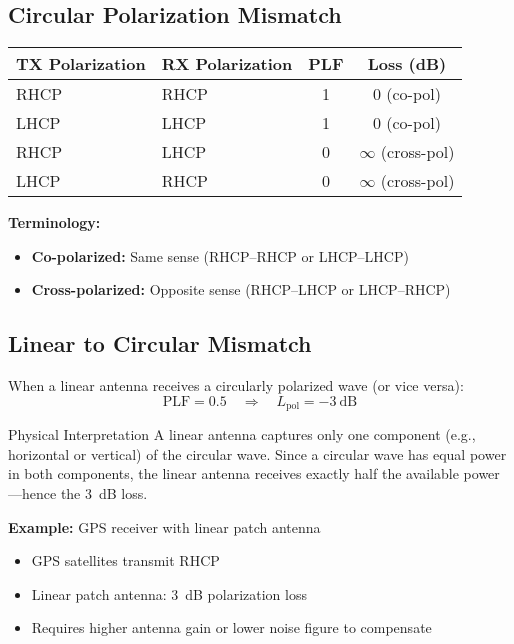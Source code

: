 \subsection{Circular Polarization Mismatch}

\begin{center}
\begin{tabular}{@{}llcc@{}}
\toprule
\textbf{TX Polarization} & \textbf{RX Polarization} & \textbf{PLF} & \textbf{Loss (dB)} \\
\midrule
RHCP & RHCP & 1 & 0 (co-pol) \\
LHCP & LHCP & 1 & 0 (co-pol) \\
RHCP & LHCP & 0 & $\infty$ (cross-pol) \\
LHCP & RHCP & 0 & $\infty$ (cross-pol) \\
\bottomrule
\end{tabular}
\end{center}

\textbf{Terminology:}
\begin{itemize}
\item \textbf{Co-polarized:} Same sense (RHCP--RHCP or LHCP--LHCP)
\item \textbf{Cross-polarized:} Opposite sense (RHCP--LHCP or LHCP--RHCP)
\end{itemize}

\subsection{Linear to Circular Mismatch}

When a linear antenna receives a circularly polarized wave (or vice versa):
\begin{equation}
\mathrm{PLF} = 0.5 \quad \Rightarrow \quad L_{\text{pol}} = -3\ \text{dB}
\label{eq:lin-circ-loss}
\end{equation}

\begin{calloutbox}{Physical Interpretation}
A linear antenna captures only one component (e.g., horizontal or vertical) of the circular wave. Since a circular wave has equal power in both components, the linear antenna receives exactly half the available power---hence the 3~dB loss.
\end{calloutbox}

\textbf{Example:} GPS receiver with linear patch antenna
\begin{itemize}
\item GPS satellites transmit RHCP
\item Linear patch antenna: 3~dB polarization loss
\item Requires higher antenna gain or lower noise figure to compensate
\end{itemize}

